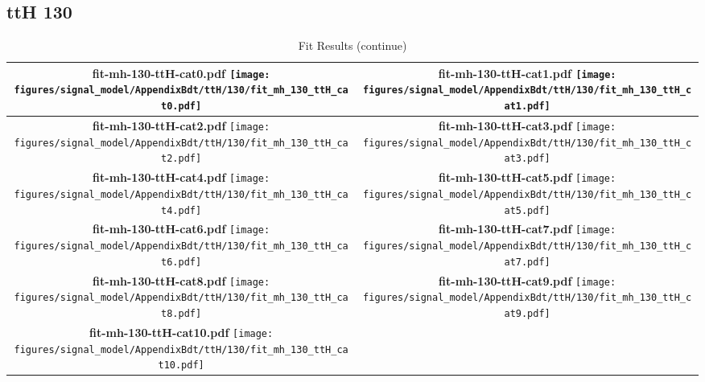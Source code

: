 \subsection{ttH 130}
\begin{longtable}{|c|c|}
\caption{Fit Results}
\endfirsthead
\caption{Fit Results (continue)}
\endhead
\hline
\parbox{0.47\textwidth}{
\centering
{\bfseries fit-mh-130-ttH-cat0.pdf}
\texttt{[image: figures/signal\_model/AppendixBdt/ttH/130/fit\_mh\_130\_ttH\_cat0.pdf]}
}
 & \parbox{0.47\textwidth}{
\centering
{\bfseries fit-mh-130-ttH-cat1.pdf}
\texttt{[image: figures/signal\_model/AppendixBdt/ttH/130/fit\_mh\_130\_ttH\_cat1.pdf]}
}
 \\
\hline
\parbox{0.47\textwidth}{
\centering
{\bfseries fit-mh-130-ttH-cat2.pdf}
\texttt{[image: figures/signal\_model/AppendixBdt/ttH/130/fit\_mh\_130\_ttH\_cat2.pdf]}
}
 & \parbox{0.47\textwidth}{
\centering
{\bfseries fit-mh-130-ttH-cat3.pdf}
\texttt{[image: figures/signal\_model/AppendixBdt/ttH/130/fit\_mh\_130\_ttH\_cat3.pdf]}
}
 \\
\hline
\parbox{0.47\textwidth}{
\centering
{\bfseries fit-mh-130-ttH-cat4.pdf}
\texttt{[image: figures/signal\_model/AppendixBdt/ttH/130/fit\_mh\_130\_ttH\_cat4.pdf]}
}
 & \parbox{0.47\textwidth}{
\centering
{\bfseries fit-mh-130-ttH-cat5.pdf}
\texttt{[image: figures/signal\_model/AppendixBdt/ttH/130/fit\_mh\_130\_ttH\_cat5.pdf]}
}
 \\
\hline
\parbox{0.47\textwidth}{
\centering
{\bfseries fit-mh-130-ttH-cat6.pdf}
\texttt{[image: figures/signal\_model/AppendixBdt/ttH/130/fit\_mh\_130\_ttH\_cat6.pdf]}
}
 & \parbox{0.47\textwidth}{
\centering
{\bfseries fit-mh-130-ttH-cat7.pdf}
\texttt{[image: figures/signal\_model/AppendixBdt/ttH/130/fit\_mh\_130\_ttH\_cat7.pdf]}
}
 \\
\hline
\parbox{0.47\textwidth}{
\centering
{\bfseries fit-mh-130-ttH-cat8.pdf}
\texttt{[image: figures/signal\_model/AppendixBdt/ttH/130/fit\_mh\_130\_ttH\_cat8.pdf]}
}
 & \parbox{0.47\textwidth}{
\centering
{\bfseries fit-mh-130-ttH-cat9.pdf}
\texttt{[image: figures/signal\_model/AppendixBdt/ttH/130/fit\_mh\_130\_ttH\_cat9.pdf]}
}
 \\
\hline
\parbox{0.47\textwidth}{
\centering
{\bfseries fit-mh-130-ttH-cat10.pdf}
\texttt{[image: figures/signal\_model/AppendixBdt/ttH/130/fit\_mh\_130\_ttH\_cat10.pdf]}
}
\end{longtable}
